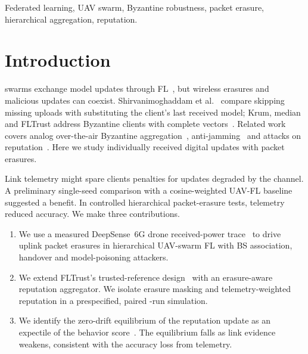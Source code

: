 \documentclass[journal]{IEEEtran}
\begin{document}
\begin{IEEEkeywords}
Federated learning, UAV swarm, Byzantine robustness, packet erasure, hierarchical aggregation, reputation.
\end{IEEEkeywords}

\section{Introduction}
 swarms exchange model updates through FL~\cite{mcmahan2017fedavg,xiao2021uavswarm},
but wireless erasures and malicious updates can coexist. Shirvanimoghaddam
et al.~\cite{shirvanimoghaddam2022erroneous} compare skipping missing uploads with
substituting the client's last received model; Krum,
median and FLTrust address Byzantine clients with complete vectors~\cite{blanchard2017krum,yin2018median,cao2021fltrust}.
Related work covers analog over-the-air Byzantine aggregation~\cite{fan2026uavbyz,yao2025fedsac},
anti-jamming~\cite{barkatsa2024jamming} and attacks on reputation~\cite{liu2026evade}.
Here we study individually received digital updates with packet erasures.

Link telemetry might spare clients penalties for updates degraded by the channel.
A preliminary single-seed comparison with a cosine-weighted UAV-FL baseline~\cite{liao2023tee}
suggested a benefit. In controlled hierarchical packet-erasure tests, telemetry
reduced accuracy. We make three contributions.
\begin{enumerate}
\item We use a measured DeepSense~6G drone received-power trace~\cite{alkhateeb2023deepsense,charan2025drone}
  to drive uplink packet erasures in hierarchical UAV-swarm FL with BS association,
  handover and model-poisoning attackers.
\item We extend FLTrust's trusted-reference design~\cite{cao2021fltrust} with
  an erasure-aware reputation aggregator. We isolate erasure masking and
  telemetry-weighted reputation in a prespecified, paired \NumRuns-run simulation.
\item We identify the zero-drift equilibrium of the reputation update as an expectile
  of the behavior score~\cite{newey1987expectile}. The equilibrium falls as link
  evidence weakens, consistent with the accuracy loss from telemetry.
\end{enumerate}
\end{document}
